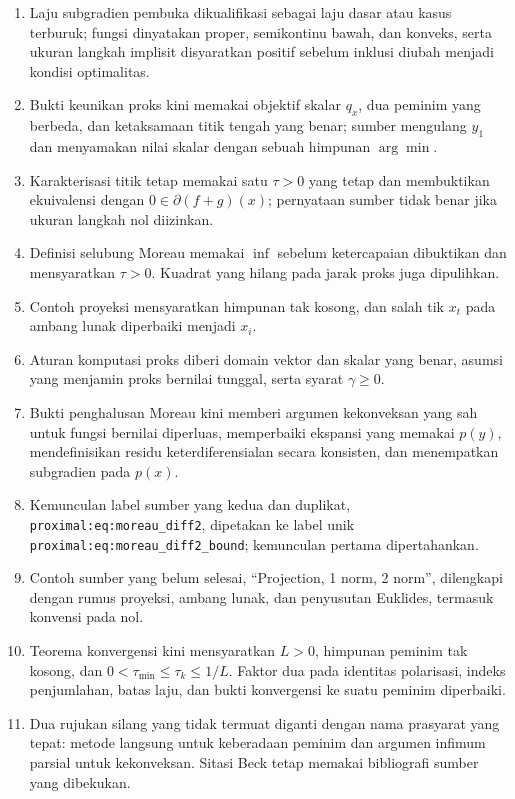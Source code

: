 \documentclass[indonesian]{shinybook}
\begin{document}
\begin{enumerate}
    \item Laju subgradien pembuka dikualifikasi sebagai laju dasar atau kasus terburuk; fungsi dinyatakan proper, semikontinu bawah, dan konveks, serta ukuran langkah implisit disyaratkan positif sebelum inklusi diubah menjadi kondisi optimalitas.
    \item Bukti keunikan proks kini memakai objektif skalar \(q_x\), dua peminim yang berbeda, dan ketaksamaan titik tengah yang benar; sumber mengulang \(y_1\) dan menyamakan nilai skalar dengan sebuah himpunan \(\arg\min\).
    \item Karakterisasi titik tetap memakai satu \(\tau>0\) yang tetap dan membuktikan ekuivalensi dengan \(0\in\partial(f+g)(x)\); pernyataan sumber tidak benar jika ukuran langkah nol diizinkan.
    \item Definisi selubung Moreau memakai \(\inf\) sebelum ketercapaian dibuktikan dan mensyaratkan \(\tau>0\). Kuadrat yang hilang pada jarak proks juga dipulihkan.
    \item Contoh proyeksi mensyaratkan himpunan tak kosong, dan salah tik \(x_t\) pada ambang lunak diperbaiki menjadi \(x_i\).
    \item Aturan komputasi proks diberi domain vektor dan skalar yang benar, asumsi yang menjamin proks bernilai tunggal, serta syarat \(\gamma\geq0\).
    \item Bukti penghalusan Moreau kini memberi argumen kekonveksan yang sah untuk fungsi bernilai diperluas, memperbaiki ekspansi yang memakai \(p(y)\), mendefinisikan residu keterdiferensialan secara konsisten, dan menempatkan subgradien pada \(p(x)\).
    \item Kemunculan label sumber yang kedua dan duplikat, \texttt{proximal:eq:moreau\_diff2}, dipetakan ke label unik \texttt{proximal:eq:moreau\_diff2\_bound}; kemunculan pertama dipertahankan.
    \item Contoh sumber yang belum selesai, \enquote{Projection, 1 norm, 2 norm}, dilengkapi dengan rumus proyeksi, ambang lunak, dan penyusutan Euklides, termasuk konvensi pada nol.
    \item Teorema konvergensi kini mensyaratkan \(L>0\), himpunan peminim tak kosong, dan \(0<\tau_{\min}\leq\tau_k\leq1/L\). Faktor dua pada identitas polarisasi, indeks penjumlahan, batas laju, dan bukti konvergensi ke suatu peminim diperbaiki.
    \item Dua rujukan silang yang tidak termuat diganti dengan nama prasyarat yang tepat: metode langsung untuk keberadaan peminim dan argumen infimum parsial untuk kekonveksan. Sitasi Beck tetap memakai bibliografi sumber yang dibekukan.
\end{enumerate}
\end{document}
